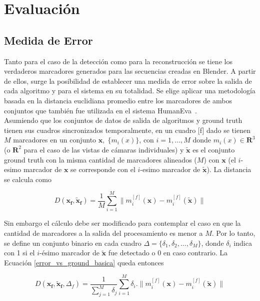\chapter{Evaluación}
\label{evaluacion}
\section{Medida de Error}
\label{subsec:medida_error}

Tanto para el caso de la detección como para la reconstrucción se tiene los verdaderos marcadores generados para las secuencias creadas en Blender. A partir de ellos, surge la posibilidad de establecer una medida de error sobre la salida de cada algoritmo y para el sistema en su totalidad. Se elige aplicar una metodología basada en la distancia euclidiana promedio entre los marcadores de ambos conjuntos que también fue utilizada en el sistema HumanEva~\cite{humaneva}. 
\\ 

Asumiendo que los conjuntos de datos de salida de algoritmos y ground truth tienen sus cuadros sincronizados temporalmente, en un cuadro [f] dado se tienen $M$ marcadores en un conjunto $\boldsymbol{x},\;\{m_{i}(x)\}$, con $i=1,\ldots,M $ donde $ m_{i}(x)\in{\mathbf{R}^{3}} $ (o $ \mathbf{R}^{2} $ para el caso de las vistas de cámaras individuales) y $ \boldsymbol{\tilde{x}} $ es el conjunto ground truth con la misma cantidad de marcadores alineados ($M$) con $\boldsymbol{x}$ (el $i$-esimo marcador de $\boldsymbol{x}$ se corresponde con el  $i$-esimo marcador de $\boldsymbol{\tilde{x}}$). La distancia se calcula como

\begin{equation} \label{error_vs_ground_basica}
D(\boldsymbol{x_{f}},\boldsymbol{\tilde{x}_{f}})=\frac{1}{M}\sum_{i=1}^{M} \|m_{i}^{[f]}(\boldsymbol{x})-m_{i}^{[f]}(\boldsymbol{\tilde{x}})\|
\end{equation}

Sin embargo el cálculo debe ser modificado para contemplar el caso en que la cantidad de marcadores a la salida del procesamiento es menor a $M$. Por lo tanto, se define un conjunto binario en cada cuadro $\Delta=\{\delta_1,\delta_2,\ldots,\delta_M\}$, donde $\delta_i$ indica con 1 si el $i$-ésimo marcador de $\boldsymbol{\tilde{x}}$ fue detectado o $0$ en caso contrario. La Ecuación \eqref{error_vs_ground_basica} queda entonces

\begin{equation}\label{error_vs_ground_deteccion}
D(\boldsymbol{x_{f}},\boldsymbol{\tilde{x}_{f}},\Delta_{f})=\frac{1}{\sum_{j=1}^{M} \delta_j} \sum_{i=1}^{M} \delta_i.\|m_{i}^{[f]}(\boldsymbol{x})-m_{i}^{[f]}(\boldsymbol{\tilde{x}})\|
\end{equation}


